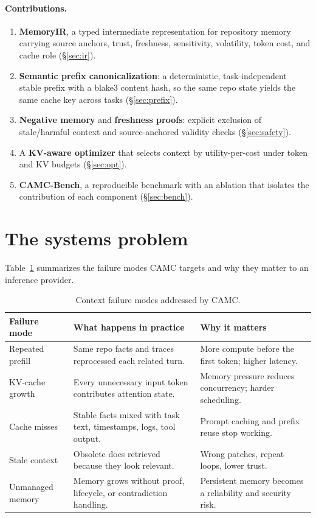 \documentclass[11pt]{article}
\begin{document}
\paragraph{Contributions.}
\begin{enumerate}[leftmargin=*]
  \item \textbf{MemoryIR}, a typed intermediate representation for repository
        memory carrying source anchors, trust, freshness, sensitivity, volatility,
        token cost, and cache role (\S\ref{sec:ir}).
  \item \textbf{Semantic prefix canonicalization}: a deterministic, task-independent
        stable prefix with a blake3 content hash, so the same repo state yields the
        same cache key across tasks (\S\ref{sec:prefix}).
  \item \textbf{Negative memory} and \textbf{freshness proofs}: explicit exclusion
        of stale/harmful context and source-anchored validity checks
        (\S\ref{sec:safety}).
  \item A \textbf{KV-aware optimizer} that selects context by utility-per-cost under
        token and KV budgets (\S\ref{sec:opt}).
  \item \textbf{CAMC-Bench}, a reproducible benchmark with an ablation that isolates
        the contribution of each component (\S\ref{sec:bench}).
\end{enumerate}

\section{The systems problem}

Table~\ref{tab:failures} summarizes the failure modes CAMC targets and why they
matter to an inference provider.

\begin{table}[h]
\centering
\small
\begin{tabular}{@{}p{2.6cm}p{5.2cm}p{5.2cm}@{}}
\toprule
\textbf{Failure mode} & \textbf{What happens in practice} & \textbf{Why it matters} \\
\midrule
Repeated prefill & Same repo facts and traces reprocessed each related turn. & More compute before the first token; higher latency. \\
KV-cache growth & Every unnecessary input token contributes attention state. & Memory pressure reduces concurrency; harder scheduling. \\
Cache misses & Stable facts mixed with task text, timestamps, logs, tool output. & Prompt caching and prefix reuse stop working. \\
Stale context & Obsolete docs retrieved because they look relevant. & Wrong patches, repeat loops, lower trust. \\
Unmanaged memory & Memory grows without proof, lifecycle, or contradiction handling. & Persistent memory becomes a reliability and security risk. \\
\bottomrule
\end{tabular}
\caption{Context failure modes addressed by CAMC.}
\label{tab:failures}
\end{table}
\end{document}
